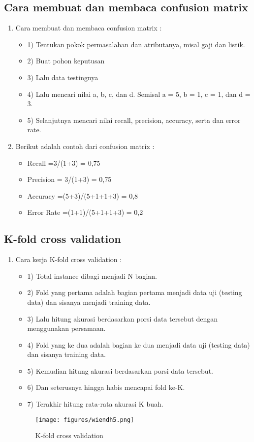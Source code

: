 \subsection{ Cara membuat dan membaca confusion matrix }
\begin{enumerate}
\item Cara membuat dan membaca confusion matrix :
\begin{itemize}
\item 1)	Tentukan pokok permasalahan dan atributanya, misal gaji dan listik.
\item 2)	Buat pohon keputusan
\item 3)	Lalu data testingnya
\item 4)	Lalu mencari nilai a, b, c, dan d. Semisal a = 5, b = 1, c = 1, dan d = 3.
\item 5)	Selanjutnya mencari nilai recall, precision, accuracy, serta dan error rate.
\end{itemize}
\item Berikut adalah contoh dari confusion matrix :
\begin{itemize}
\item Recall =3/(1+3) = 0,75
\item Precision = 3/(1+3) = 0,75
\item Accuracy =(5+3)/(5+1+1+3) = 0,8
\item Error Rate =(1+1)/(5+1+1+3) = 0,2
\end{itemize}
\end{enumerate}

\subsection{K-fold cross validation}
\begin{enumerate}
\item Cara kerja K-fold cross validation :
\begin{itemize}
\item 1)	Total instance dibagi menjadi N bagian.
\item 2)	Fold yang pertama adalah bagian pertama menjadi data uji (testing data) dan sisanya menjadi training data.
\item 3)	Lalu hitung akurasi berdasarkan porsi data tersebut dengan menggunakan persamaan.
\item 4)	Fold yang ke dua adalah bagian ke dua menjadi data uji (testing data) dan sisanya training data. 
\item 5)	Kemudian hitung akurasi berdasarkan porsi data tersebut.
\item 6)	Dan seterusnya hingga habis mencapai fold ke-K.
\item 7)	Terakhir hitung rata-rata akurasi K buah.
\end{itemize}
\begin{figure}[ht]
\centering
\texttt{[image: figures/wiendh5.png]}
\caption{K-fold cross validation }
\label{contoh}
\end{figure}
\end{enumerate}

